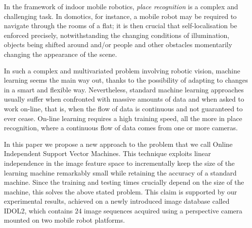In the framework of indoor mobile robotics, \emph{place recognition}
is a complex and challenging task. In domotics, for instance, a mobile
robot may be required to navigate through the rooms of a flat; it is
then crucial that self-localisation be enforced precisely,
notwithstanding the changing conditions of illumination, objects being
shifted around and/or people and other obstacles momentarily changing
the appearance of the scene.

In such a complex and multivariated problem involving robotic vision,
machine learning seems the main way out, thanks to the possibility of
adapting to changes in a smart and flexible way. Nevertheless,
standard machine learning approaches usually suffer when confronted
with massive amounts of data and when asked to work on-line, that is,
when the flow of data is continuous and not guaranteed to ever
cease. On-line learning requires a high training speed, all the more
in place recognition, where a continuous flow of data comes from one
or more cameras.

In this paper we propose a new approach to the problem that we call
Online Independent Support Vector Machines. This technique exploits
linear independence in the image feature space to incrementally keep
the size of the learning machine remarkably small while retaining the
accuracy of a standard machine. Since the training and testing times
crucially depend on the size of the machine, this solves the above
stated problem. This claim is supported by our experimental results,
achieved on a newly introduced image database called IDOL2, which
contains $24$ image sequences acquired using a perspective camera
mounted on two mobile robot platforms.
